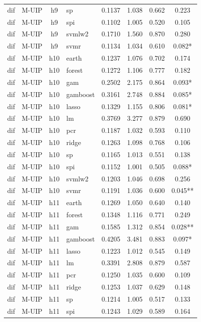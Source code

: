 \begin{ThreePartTable}
\begin{longtable}[t]{llclcccc}
dif & M-UIP & h9 & sp & 0.1137 & 1.038 & 0.662 & 0.223\\
dif & M-UIP & h9 & spi & 0.1102 & 1.005 & 0.520 & 0.105\\
dif & M-UIP & h9 & svmlw2 & 0.1710 & 1.560 & 0.870 & 0.280\\
dif & M-UIP & h9 & svmr & 0.1134 & 1.034 & 0.610 & 0.082*\\
\addlinespace
dif & M-UIP & h10 & earth & 0.1237 & 1.076 & 0.702 & 0.174\\
dif & M-UIP & h10 & forest & 0.1272 & 1.106 & 0.777 & 0.182\\
dif & M-UIP & h10 & gam & 0.2502 & 2.175 & 0.864 & 0.093*\\
dif & M-UIP & h10 & gamboost & 0.3161 & 2.748 & 0.884 & 0.085*\\
dif & M-UIP & h10 & lasso & 0.1329 & 1.155 & 0.806 & 0.081*\\
dif & M-UIP & h10 & lm & 0.3769 & 3.277 & 0.879 & 0.690\\
dif & M-UIP & h10 & pcr & 0.1187 & 1.032 & 0.593 & 0.110\\
dif & M-UIP & h10 & ridge & 0.1263 & 1.098 & 0.768 & 0.106\\
dif & M-UIP & h10 & sp & 0.1165 & 1.013 & 0.551 & 0.138\\
dif & M-UIP & h10 & spi & 0.1152 & 1.001 & 0.505 & 0.088*\\
dif & M-UIP & h10 & svmlw2 & 0.1203 & 1.046 & 0.698 & 0.256\\
dif & M-UIP & h10 & svmr & 0.1191 & 1.036 & 0.600 & 0.045**\\
\addlinespace
dif & M-UIP & h11 & earth & 0.1269 & 1.050 & 0.640 & 0.140\\
dif & M-UIP & h11 & forest & 0.1348 & 1.116 & 0.771 & 0.249\\
dif & M-UIP & h11 & gam & 0.1585 & 1.312 & 0.854 & 0.028**\\
dif & M-UIP & h11 & gamboost & 0.4205 & 3.481 & 0.883 & 0.097*\\
dif & M-UIP & h11 & lasso & 0.1223 & 1.012 & 0.545 & 0.149\\
dif & M-UIP & h11 & lm & 0.3391 & 2.808 & 0.879 & 0.587\\
dif & M-UIP & h11 & pcr & 0.1250 & 1.035 & 0.600 & 0.109\\
dif & M-UIP & h11 & ridge & 0.1253 & 1.037 & 0.629 & 0.148\\
dif & M-UIP & h11 & sp & 0.1214 & 1.005 & 0.517 & 0.133\\
dif & M-UIP & h11 & spi & 0.1243 & 1.029 & 0.589 & 0.164\\

\end{longtable}
\end{ThreePartTable}
